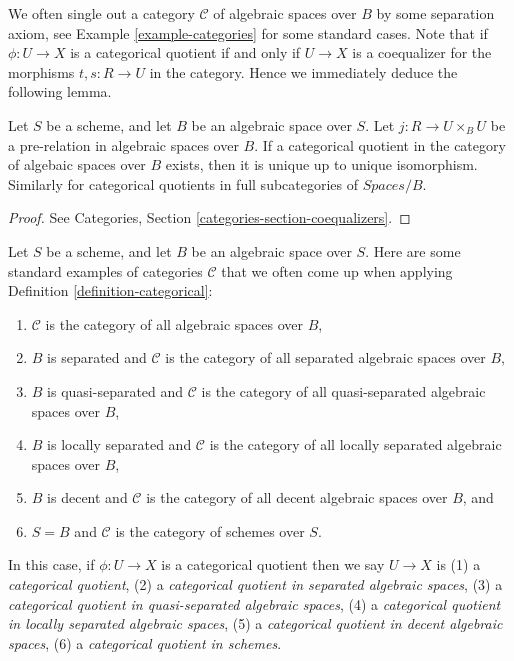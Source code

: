 \noindent
We often single out a category $\mathcal{C}$ of algebraic spaces over $B$
by some separation axiom, see
Example \ref{example-categories}
for some standard cases.
Note that if $\phi : U \to X$ is a categorical quotient if and only
if $U \to X$ is a coequalizer for the
morphisms $t, s : R \to U$ in the category. Hence we immediately
deduce the following lemma.

\begin{lemma}
\label{lemma-categorical-unique}
Let $S$ be a scheme, and let $B$ be an algebraic space over $S$.
Let $j : R \to U \times_B U$ be a pre-relation in algebraic spaces over $B$.
If a categorical quotient in the category of algebaic spaces
over $B$ exists, then it is unique up to unique isomorphism.
Similarly for categorical quotients in full subcategories of
$\textit{Spaces}/B$.
\end{lemma}

\begin{proof}
See Categories, Section \ref{categories-section-coequalizers}.
\end{proof}

\begin{example}
\label{example-categories}
Let $S$ be a scheme, and let $B$ be an algebraic space over $S$.
Here are some standard examples of categories $\mathcal{C}$
that we often come up when applying
Definition \ref{definition-categorical}:
\begin{enumerate}
\item $\mathcal{C}$ is the category of all algebraic spaces over $B$,
\item $B$ is separated and $\mathcal{C}$ is the category of all separated
algebraic spaces over $B$,
\item $B$ is quasi-separated and $\mathcal{C}$ is the category of all
quasi-separated algebraic spaces over $B$,
\item $B$ is locally separated and $\mathcal{C}$ is the category of all
locally separated algebraic spaces over $B$,
\item $B$ is decent and $\mathcal{C}$ is the category of all decent algebraic
spaces over $B$, and
\item $S = B$ and $\mathcal{C}$ is the category of schemes over $S$.
\end{enumerate}
In this case, if $\phi : U \to X$ is a categorical quotient then we say
$U \to X$ is
(1) a {\it categorical quotient},
(2) a {\it categorical quotient in separated algebraic spaces},
(3) a {\it categorical quotient in quasi-separated algebraic spaces},
(4) a {\it categorical quotient in locally separated algebraic spaces},
(5) a {\it categorical quotient in decent algebraic spaces},
(6) a {\it categorical quotient in schemes}.
\end{example}

